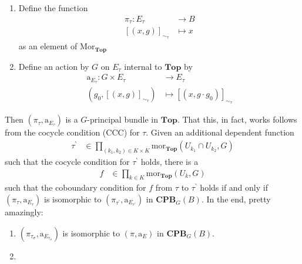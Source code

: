 \begin{exa}[Bundles 2]
\begin{enumerate}
by
\begin{align*}
  (x_{k_{1}},g_{k_{1}})
  \sim_{\tau}
  (x_{k_{2}},g_{k_{2}})
  \qquad
  &\Leftrightarrow
  \qquad
  x_{k_{1}}
  =
  x_{k_{2}}
  \quad
  \land
  \quad
  g_{k_{1}}
  \cdot
  \tau(k_{1},k_{2})
  =
  g_{k_{2}}
\end{align*}
Then set
\begin{align*}
  E_{\tau}
  &:=
  \left.
    \coprod_{k \in K}
    U_{k}
    \times
    G
  \right\slash
  \sim_{\tau}
\end{align*}
\item[(b)]
Define the function
\begin{align*}
  \pi_{\tau}
  \colon
  E_{\tau}
  &\rightarrow
  B
  \\
  [(x,g)]_{\sim_{\tau}}
  &\mapsto
  x
\end{align*}
as an element of $\mathrm{Mor}_{\mathbf{Top}}$
\item[(c)]
Define an action by $G$ on $E_{\tau}$ internal to $\mathbf{Top}$ by
\begin{align*}
  \mathrm{a}_{E_{\tau}}
  \colon
  G
  \times
  E_{\tau}
  &\rightarrow
  E_{\tau}
  \\
  (g_{0},[(x,g)]_{\sim_{\tau}})
  &\mapsto
  [(x,g \cdot g_{0})]_{\sim_{\tau}}
\end{align*}
\end{enumerate}
Then $(\pi_{\tau},\mathrm{a}_{E_{\tau}})$ is a $G$-principal bundle in $\mathbf{Top}$.
That this, in fact, works follows from the cocycle condition (CCC) for $\tau$.
Given an additional dependent function
\begin{align*}
  \tau^{\backprime}
  &\in
  \prod_{(k_{1},k_{2}) \in K \times K}
  \mathrm{mor}_{\mathbf{Top}}(U_{k_{1}} \cap U_{k_{2}},G)
\end{align*}
such that the cocycle condition for $\tau^{\backprime}$ holds, there is a
\begin{align*}
  f
  &\in
  \prod_{k \in K}
  \mathrm{mor}_{\mathbf{Top}}(U_{k},G)
\end{align*}
such that the coboundary condition for $f$ from $\tau$ to $\tau^{\backprime}$ holds if and only if $(\pi_{\tau},\mathrm{a}_{E_{\tau}})$ is isomorphic to $(\pi_{\tau^{\backprime}},\mathrm{a}_{E_{\tau^{\backprime}}})$ in $\mathbf{CPB}_{G}(B)$.
In the end, pretty amazingly:
\begin{enumerate}
\item[$\bullet$]
$(\pi_{\tau_{\sigma}},\mathrm{a}_{E_{\tau_{\sigma}}})$ is isomorphic to $(\pi,\mathrm{a}_{E})$ in $\mathbf{CPB}_{G}(B)$.
\item[$\bullet$]

\end{enumerate}
\end{exa}
